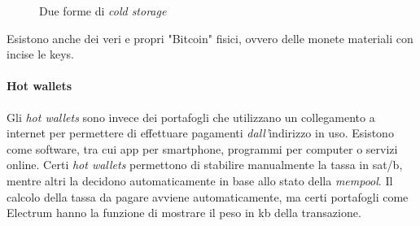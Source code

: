 \documentclass {article}
\begin{document}
\begin{figure}[htb!]

 
\caption{Due forme di \textit{cold storage}}

\end{figure}
\vspace {0.2cm}
\noindent
%
Esistono anche dei veri e propri "Bitcoin" fisici, ovvero delle monete materiali con incise le keys.

\paragraph {Hot wallets}

Gli \textit{hot wallets} sono invece dei portafogli che utilizzano un collegamento a internet per permettere di effettuare pagamenti \emph{dall'}indirizzo in uso.
Esistono come software, tra cui app per smartphone, programmi per computer o servizi online.
Certi \textit{hot wallets} permettono di stabilire manualmente la tassa in sat/b, mentre altri la decidono automaticamente in base allo stato della \textit{mempool}.
Il calcolo della tassa da pagare avviene automaticamente, ma certi portafogli come Electrum hanno la funzione di mostrare il peso in kb della transazione.
\end{document}
